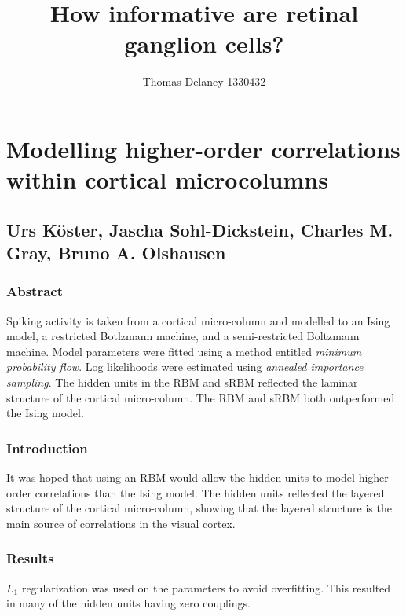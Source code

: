 \documentclass[a4paper,12pt]{article}
\title{How informative are retinal ganglion cells?}
\author{Thomas Delaney 1330432}
\theoremstyle{definition}
\begin{document}
\section*{Modelling higher-order correlations within cortical microcolumns}
\subsection*{Urs K\"{o}ster, Jascha Sohl-Dickstein, Charles M. Gray, Bruno A. Olshausen}
\subsubsection*{Abstract}
	Spiking activity is taken from a cortical micro-column and modelled to an Ising model, a restricted Botlzmann machine, and a semi-restricted Boltzmann machine. Model parameters were fitted using a method entitled \textit{minimum probability flow}. Log likelihoods were estimated using \textit{annealed importance sampling}. The hidden units in the RBM and sRBM reflected the laminar structure of the cortical micro-column. The RBM and sRBM both outperformed the Ising model.

\subsubsection*{Introduction}
	It was hoped that using an RBM would allow the hidden units to model higher order correlations than the Ising model. The hidden units reflected the layered structure of the cortical micro-column, showing that the layered structure is the main source of correlations in the visual cortex. 
	
\subsubsection*{Results}
	$L_1$ regularization was used on the parameters to avoid overfitting. This resulted in many of the hidden units having zero couplings.
	
\end{document}
